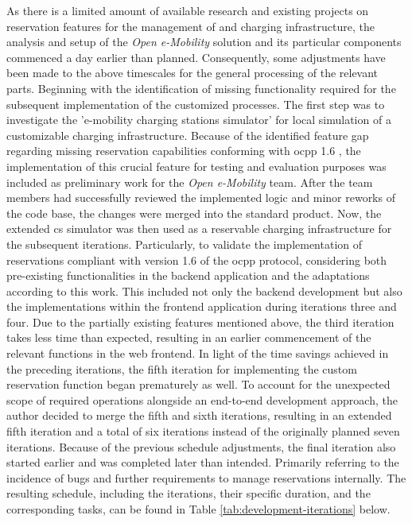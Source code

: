 As there is a limited amount of available research and existing projects on reservation features for the management of  and charging infrastructure, the analysis and setup of the \textit{Open e-Mobility} \cite{noauthor_github_nodate,noauthor_github_nodate-1,noauthor_github_nodate-2,noauthor_github_nodate-3} solution and its particular components commenced a day earlier than planned.
Consequently, some adjustments have been made to the above timescales for the general processing of the relevant parts.
Beginning with the identification of missing functionality required for the subsequent implementation of the customized processes.
The first step was to investigate the 'e-mobility charging stations simulator' \cite{noauthor_github_nodate-3} for local simulation of a customizable charging infrastructure.
Because of the identified feature gap regarding missing reservation capabilities conforming with \acrshort{ocpp} 1.6 \cite{noauthor_ocpp_nodate}, the implementation of this crucial feature for testing and evaluation purposes was included as preliminary work for the \textit{Open e-Mobility} team.
After the team members had successfully reviewed the implemented logic and minor reworks of the code base, the changes were merged into the standard product.
Now, the extended \acrshort{cs} simulator was then used as a reservable charging infrastructure for the subsequent iterations.
Particularly, to validate the implementation of reservations compliant with version 1.6 of the \acrshort{ocpp} protocol, considering both pre-existing functionalities in the backend application and the adaptations according to this work.
This included not only the backend development but also the implementations within the frontend application during iterations three and four.
Due to the partially existing features mentioned above, the third iteration takes less time than expected, resulting in an earlier commencement of the relevant functions in the web frontend.
In light of the time savings achieved in the preceding iterations, the fifth iteration for implementing the custom reservation function began prematurely as well. 
To account for the unexpected scope of required operations alongside an end-to-end development approach, the author decided to merge the fifth and sixth iterations, resulting in an extended fifth iteration and a total of six iterations instead of the originally planned seven iterations.
Because of the previous schedule adjustments, the final iteration also started earlier and was completed later than intended. 
Primarily referring to the incidence of bugs and further requirements to manage reservations internally.
The resulting schedule, including the iterations, their specific duration, and the corresponding tasks, can be found in Table \ref{tab:development-iterations} below.

